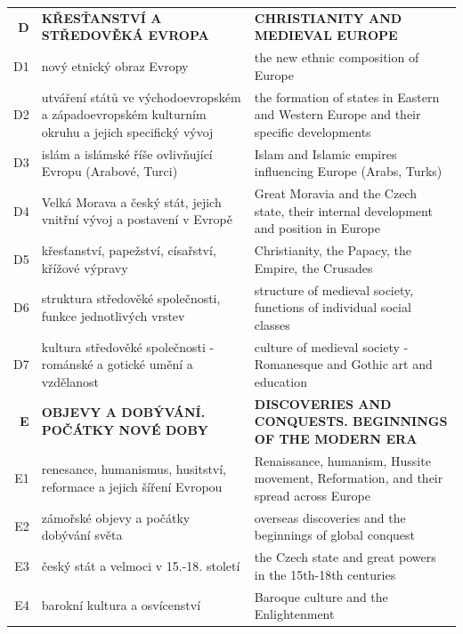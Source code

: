 \documentclass[]{interact}
\theoremstyle{plain}%
\theoremstyle{definition}
\theoremstyle{remark}
\begin{document}
\begin{table}
{\begin{tabular}{r|p{10cm}|p{10cm}}
\textbf{D} & \textbf{KŘESŤANSTVÍ A STŘEDOVĚKÁ EVROPA} & \textbf{CHRISTIANITY AND MEDIEVAL EUROPE} \\
D1 & nový etnický obraz Evropy & the new ethnic composition of Europe \\ \hline
D2 & utváření států ve východoevropském a západoevropském kulturním okruhu a jejich specifický vývoj & the formation of states in Eastern and Western Europe and their specific developments \\ 
D3 & islám a islámské říše ovlivňující Evropu (Arabové, Turci) & Islam and Islamic empires influencing Europe (Arabs, Turks) \\ 
D4 & Velká Morava a český stát, jejich vnitřní vývoj a postavení v Evropě & Great Moravia and the Czech state, their internal development and position in Europe \\ 
D5 & křesťanství, papežství, císařství, křížové výpravy & Christianity, the Papacy, the Empire, the Crusades \\ 
D6 & struktura středověké společnosti, funkce jednotlivých vrstev & structure of medieval society, functions of individual social classes \\ 
D7 & kultura středověké společnosti - románské a gotické umění a vzdělanost & culture of medieval society - Romanesque and Gothic art and education \\ \hline

\textbf{E} & \textbf{OBJEVY A DOBÝVÁNÍ. POČÁTKY NOVÉ DOBY} & \textbf{DISCOVERIES AND CONQUESTS. BEGINNINGS OF THE MODERN ERA} \\ 
E1 & renesance, humanismus, husitství, reformace a jejich šíření Evropou & Renaissance, humanism, Hussite movement, Reformation, and their spread across Europe \\ 
E2 & zámořské objevy a počátky dobývání světa & overseas discoveries and the beginnings of global conquest \\ 
E3 & český stát a velmoci v 15.-18. století & the Czech state and great powers in the 15th-18th centuries \\ 
E4 & barokní kultura a osvícenství & Baroque culture and the Enlightenment \\ \hline


\end{tabular}}
\end{table}
\end{document}
